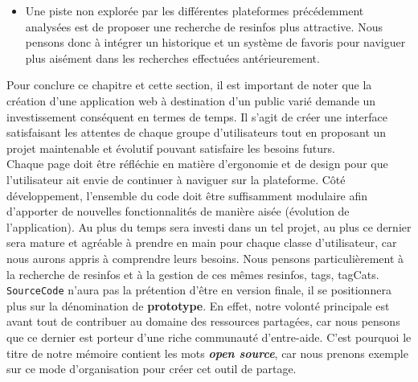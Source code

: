 \begin{itemize}
    \item Une piste non explorée par les différentes plateformes précédemment analysées est de proposer une recherche de \glspl{resinfo} plus attractive. Nous pensons donc à intégrer un historique et un système de favoris pour naviguer plus aisément dans les recherches effectuées antérieurement.
\end{itemize}

\pagebreak
Pour conclure ce chapitre et cette section, il est important de noter que la création d'une application web à destination d'un public varié demande un investissement conséquent en termes de temps. Il s'agit de créer une interface satisfaisant les attentes de chaque groupe d'utilisateurs tout en proposant un projet maintenable et évolutif pouvant satisfaire les besoins futurs.\\

Chaque page doit être réfléchie en matière d'ergonomie et de design pour que l'utilisateur ait envie de continuer à naviguer sur la plateforme. Côté développement, l'ensemble du code doit être suffisamment modulaire afin d'apporter de nouvelles fonctionnalités de manière aisée (évolution de l'application). Au plus du temps sera investi dans un tel projet, au plus ce dernier sera mature et agréable à prendre en main pour chaque classe d'utilisateur, car nous aurons appris à comprendre leurs besoins. Nous pensons particulièrement à la recherche de \glspl{resinfo} et à la gestion de ces mêmes \glspl{resinfo}, \glspl{tag}, \glspl{tagCat}.\\

\texttt{SourceCode} n'aura pas la prétention d'être en version finale, il se positionnera plus sur la dénomination de \textbf{prototype}. En effet, notre volonté principale est avant tout de contribuer au domaine des ressources partagées, car nous pensons que ce dernier est porteur d'une riche communauté d'entre-aide. C'est pourquoi le titre de notre mémoire contient les mots \textbf{\textit{open source}}, car nous prenons exemple sur ce mode d'organisation pour créer cet outil de partage.
